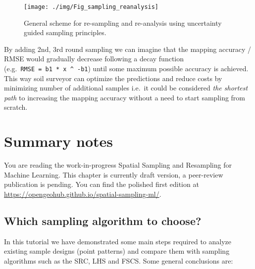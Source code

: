 \documentclass[
  graybox,natbib,nospthms]{svmono}
\begin{document}
\begin{figure}

{\centering \texttt{[image: ./img/Fig\_sampling\_reanalysis]} 

}

\caption{General scheme for re-sampling and re-analysis using uncertainty guided sampling principles.}\label{fig:scheme-resample}
\end{figure}

By adding 2nd, 3rd round sampling we can imagine that the mapping accuracy / RMSE
would gradually decrease following a decay function (e.g.~\texttt{RMSE\ =\ b1\ *\ x\ \^{}\ -b1}) until some
maximum possible accuracy is achieved. This way soil surveyor can optimize the
predictions and reduce costs by minimizing number of additional samples i.e.~it
could be considered \emph{the shortest path} to increasing the mapping accuracy without
a need to start sampling from scratch.

\hypertarget{summary-notes}{%
\chapter{Summary notes}\label{summary-notes}}

You are reading the work-in-progress Spatial Sampling and Resampling for Machine Learning. This chapter is currently draft version, a peer-review publication is pending. You can find the polished first edition at \url{https://opengeohub.github.io/spatial-sampling-ml/}.

\hypertarget{which-sampling-algorithm-to-choose}{%
\section{Which sampling algorithm to choose?}\label{which-sampling-algorithm-to-choose}}

In this tutorial we have demonstrated some main steps required to analyze
existing sample designs (point patterns) and compare them with sampling algorithms
such as the SRC, LHS and FSCS. Some general conclusions are:
\end{document}

